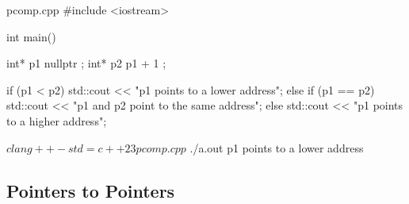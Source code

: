 \documentclass[12pt]{article}
\begin{document}
\begin{cxx}{pcomp.cpp}
#include <iostream>

int main()
{
	int* p1 { nullptr }; 
	int* p2 { p1 + 1 };

	if (p1 < p2)
		std::cout << "p1 points to a lower address\n";
	else if (p1 == p2)
		std::cout << "p1 and p2 point to the same address\n";
	else
		std::cout << "p1 points to a higher address\n";
}
\end{cxx}

\begin{terminal}
$ clang++ -std=c++23 pcomp.cpp
$ ./a.out
p1 points to a lower address
\end{terminal}

\subsection{Pointers to Pointers}
\end{document}

